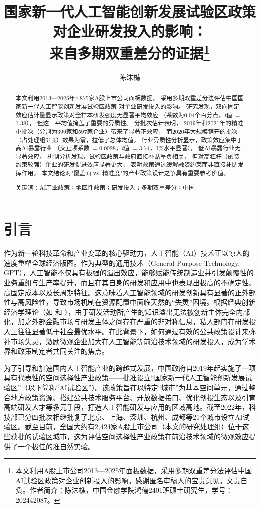 \documentclass[12pt,hyperref,a4paper,UTF8]{ctexart}
\title{\songti\bfseries\zihao{2} 国家新一代人工智能创新发展试验区政策对企业研发投入的影响：\\来自多期双重差分的证据\thanks{本文利用A股上市公司2013—2025年面板数据，采用多期双重差分法评估中国AI试验区政策对企业创新投入的影响。感谢匿名审稿人的宝贵意见。文责自负。作者简介：陈沫樵，中国金融学院鸿儒2401班硕士研究生，学号：202442087。}}
\author{\kaishu\zihao{4} 陈沫樵}
\date{}
\begin{document}
\maketitle

\begin{abstract}
本文利用2013—2025年4,875家A股上市公司面板数据，
采用多期双重差分法评估中国国家新一代人工智能创新发展试验区政策
对企业研发投入的影响。
研究发现，双向固定效应估计量显示政策对全样本研发强度无显著平均效应
（系数为0.04个百分点，\textit{t}值~= 1.38），
但这一平均值掩盖了重要的异质性。
分批次估计表明，
2019年和2021年的精准小批次（分别为399家和597家企业）带来了显著正效应，
而2020年大规模铺开的批次（占处理组51\%）效果为零，拉低了总体均值。
行业异质性分析显示，政策效应集中于高AI暴露行业
（交互项系数~= 0.0028，\textit{t}值~= 3.74，1\%水平显著），
低AI暴露行业无显著效应。
机制分析发现，试验区政策与政府直接补贴呈负相关，
但对高杠杆（融资约束较强）企业的研发促进效应显著更大，
表明政策通过缓解融资约束而非直接补贴发挥作用。
本文结论对"覆盖面 vs. 精准度"的产业政策设计之争具有重要参考价值。

{\heiti 关键词：}AI产业政策；地区性政策；研发投入；多期双重差分；中国
\end{abstract}

\section{引\quad 言}

作为新一轮科技革命和产业变革的核心驱动力，人工智能（AI）技术正以惊人的速度重塑全球经济版图。作为典型的通用技术（General Purpose Technology, GPT），人工智能不仅具有极强的溢出效应，能够赋能传统制造业并引发颠覆性的业务重组与生产率提升，而且在其自身的研发和应用中也表现出极高的不确定性、高固定成本以及长周期特征。这意味着人工智能领域的研发创新具有显著的正外部性与高风险性，导致市场机制在资源配置中面临天然的“失灵”困境。根据经典创新经济学理论（如 \textcite{hall2010financing} 和 \textcite{bloom2019firmslevelpd}），由于研发活动所产生的知识溢出无法被创新主体完全内部化，加之外部金融市场与研发主体之间存在严重的非对称信息，私人部门在研发投入上往往显著低于社会最优水平。在此背景下，如何通过有效的公共政策设计来弥补市场失灵，激励微观企业加大在人工智能等前沿技术领域的研发投入，成为学术界和政策制定者共同关注的焦点。

为了引导和加速国内人工智能产业的跨越式发展，中国政府自2019年起实施了一项具有代表性的空间选择性产业政策——批准设立“国家新一代人工智能创新发展试验区”（以下简称“AI试验区”）。该政策旨在以特定“城市”为基本空间单元，通过整合地方政策资源、搭建公共技术服务平台、开放数据接口、优化创投生态以及引育高端研发人才等多元手段，打造人工智能研发与应用的区域高地。截至2022年，科技部已分四批次相继批复了北京、上海、深圳、杭州、成都等21个城市设立AI试验区。截至目前，全国大约有2,424家A股上市公司（本文的研究处理组）位于这些获批的试验区城市，这为评估空间选择性产业政策在前沿技术领域的微观效应提供了一个极佳的准自然实验。
\end{document}
